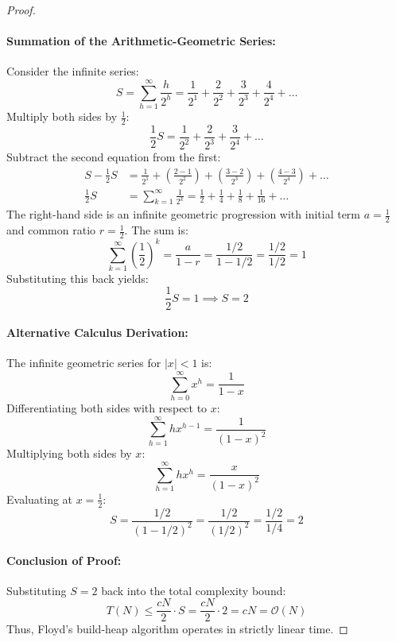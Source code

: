 \documentclass[10pt,twocolumn,letterpaper]{article}
\begin{document}
\begin{proof}
\paragraph{Summation of the Arithmetic-Geometric Series:}
Consider the infinite series:
\begin{equation}
S = \sum_{h=1}^\infty \frac{h}{2^h} = \frac{1}{2^1} + \frac{2}{2^2} + \frac{3}{2^3} + \frac{4}{2^4} + \dots
\end{equation}
Multiply both sides by $\frac{1}{2}$:
\begin{equation}
\frac{1}{2}S = \frac{1}{2^2} + \frac{2}{2^3} + \frac{3}{2^4} + \dots
\end{equation}
Subtract the second equation from the first:
\begin{align}
S - \frac{1}{2}S &= \frac{1}{2^1} + \left(\frac{2-1}{2^2}\right) + \left(\frac{3-2}{2^3}\right) + \left(\frac{4-3}{2^4}\right) + \dots \\
\frac{1}{2}S &= \sum_{k=1}^\infty \frac{1}{2^k} = \frac{1}{2} + \frac{1}{4} + \frac{1}{8} + \frac{1}{16} + \dots
\end{align}
The right-hand side is an infinite geometric progression with initial term $a = \frac{1}{2}$ and common ratio $r = \frac{1}{2}$. The sum is:
\begin{equation}
\sum_{k=1}^\infty \left(\frac{1}{2}\right)^k = \frac{a}{1 - r} = \frac{1/2}{1 - 1/2} = \frac{1/2}{1/2} = 1
\end{equation}
Substituting this back yields:
\begin{equation}
\frac{1}{2}S = 1 \implies S = 2
\end{equation}

\paragraph{Alternative Calculus Derivation:}
The infinite geometric series for $|x| < 1$ is:
\begin{equation}
\sum_{h=0}^\infty x^h = \frac{1}{1 - x}
\end{equation}
Differentiating both sides with respect to $x$:
\begin{equation}
\sum_{h=1}^\infty h x^{h-1} = \frac{1}{(1 - x)^2}
\end{equation}
Multiplying both sides by $x$:
\begin{equation}
\sum_{h=1}^\infty h x^h = \frac{x}{(1 - x)^2}
\end{equation}
Evaluating at $x = \frac{1}{2}$:
\begin{equation}
S = \frac{1/2}{(1 - 1/2)^2} = \frac{1/2}{(1/2)^2} = \frac{1/2}{1/4} = 2
\end{equation}

\paragraph{Conclusion of Proof:}
Substituting $S = 2$ back into the total complexity bound:
\begin{equation}
T(N) \le \frac{c N}{2} \cdot S = \frac{c N}{2} \cdot 2 = c N = \mathcal{O}(N)
\end{equation}
Thus, Floyd's build-heap algorithm operates in strictly linear time.
\end{proof}
\end{document}

